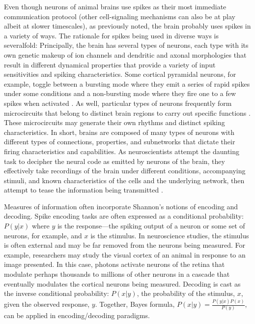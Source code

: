 Even though neurons of animal brains use spikes as their most immediate communication protocol (other cell-signaling mechanisms can also be at play albeit at slower timescales), as previously noted, the brain probably uses spikes in a variety of ways.
The rationale for spikes being used in diverse ways is severalfold:
Principally, the brain has several types of neurons, each type with its own genetic makeup of ion channels and dendritic and axonal morphologies that result in different dynamical properties that provide a variety of input sensitivities and spiking characteristics.
Some cortical pyramidal neurons, for example, toggle between a bursting mode where they emit a series of rapid spikes under some conditions and a non-bursting mode where they fire one to a few spikes when activated \cite{zeldenrustNeuralCodingBursts2018}.
As well, particular types of neurons frequently form microcircuits that belong to distinct brain regions to carry out specific functions \cite{HandbookofBrainMicrocircuits}.
These microcircuits may generate their own rhythms and distinct spiking characteristics.
In short, brains are composed of many types of neurons with different types of connections, properties, and subnetworks that dictate their firing characteristics and capabilities.
As neuroscientists attempt the daunting task to decipher the neural code as emitted by neurons of the brain, they effectively take recordings of the brain under different conditions, accompanying stimuli, and known characteristics of the cells and the underlying network, then attempt to tease the information being transmitted \cite{bialekReadingNeuralCode1991, stanleyReadingWritingNeural2013}.

Measures of information often incorporate Shannon's notions of encoding and decoding. 
Spike encoding tasks are often expressed as a conditional probability: $P\left(y|x\right)$ where $y$ is the response---the spiking output of a neuron or some set of neurons, for example, and $x$ is the stimulus. 
In neuroscience studies, the stimulus is often external and may be far removed from the neurons being measured. 
For example, researchers may study the visual cortex of an animal in response to an image presented.
In this case, photons activate neurons of the retina that modulate perhaps thousands to millions of other neurons in a cascade that eventually modulates the cortical neurons being measured.
Decoding is cast as the inverse conditional probability: $P\left(x|y\right)$, the probability of the stimulus, $x$, given the observed response, $y$.
Together, Bayes formula, $P(x|y) = \frac{P(y|x)P(x)}{P(y)}$, can be applied in encoding/decoding paradigms.

